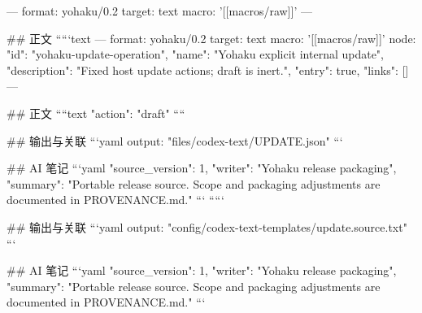 ---
format: yohaku/0.2
target: text
macro: '[[macros/raw]]'
---

## 正文
`````text
---
format: yohaku/0.2
target: text
macro: '[[macros/raw]]'
node: {"id": "yohaku-update-operation", "name": "Yohaku explicit internal update", "description": "Fixed host update actions; draft is inert.", "entry": true, "links": []}
---

## 正文
````text
{
  "action": "draft"
}
````

## 输出与关联
```yaml
output: "files/codex-text/UPDATE.json"
```

## AI 笔记
```yaml
{"source_version": 1, "writer": "Yohaku release packaging", "summary": "Portable release source. Scope and packaging adjustments are documented in PROVENANCE.md."}
```
`````

## 输出与关联
```yaml
output: "config/codex-text-templates/update.source.txt"
```

## AI 笔记
```yaml
{"source_version": 1, "writer": "Yohaku release packaging", "summary": "Portable release source. Scope and packaging adjustments are documented in PROVENANCE.md."}
```
